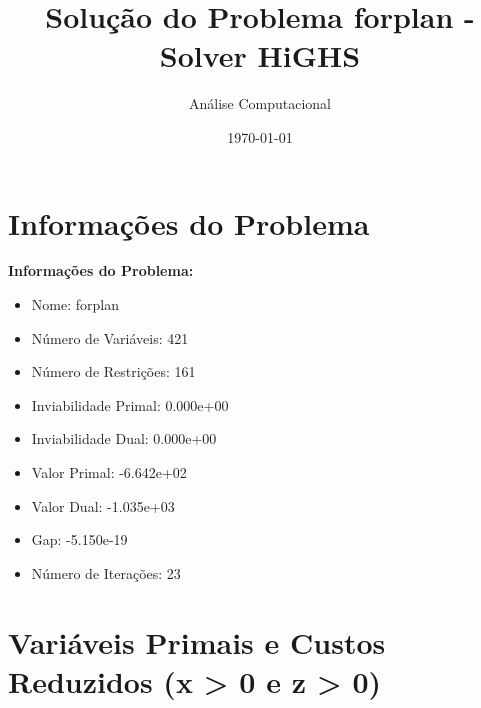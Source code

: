 \documentclass[12pt]{article}
\title{Solução do Problema forplan - Solver HiGHS}
\author{Análise Computacional}
\date{\today}
\begin{document}
\maketitle

\section{Informações do Problema}

\textbf{Informações do Problema:}
\begin{itemize}
\item Nome: forplan
\item Número de Variáveis: 421
\item Número de Restrições: 161
\item Inviabilidade Primal: 0.000e+00
\item Inviabilidade Dual: 0.000e+00
\item Valor Primal: -6.642e+02
\item Valor Dual: -1.035e+03
\item Gap: -5.150e-19
\item Número de Iterações: 23
\end{itemize}


\section{Variáveis Primais e Custos Reduzidos (x > 0 e z > 0)}
\end{document}
